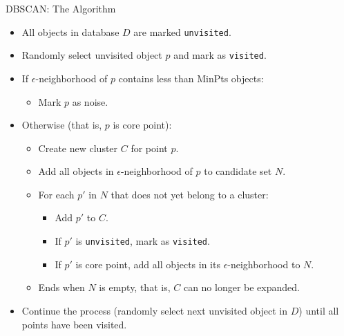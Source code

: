 \begin{frame}{DBSCAN: The Algorithm}
	\begin{itemize}
		\item All objects in database $D$ are marked \texttt{unvisited}.
		\item Randomly select unvisited object $p$ and mark as \texttt{visited}.
		\item If $\epsilon$-neighborhood of $p$ contains less than MinPts
		      objects:
		      \begin{itemize}
			      \item Mark $p$ as noise.
		      \end{itemize}
		\item Otherwise (that is, $p$ is core point):
		      \begin{itemize}
			      \item Create new cluster $C$ for point $p$.
			      \item Add all objects in $\epsilon$-neighborhood of $p$ to
			            candidate set $N$.
			      \item For each $p'$ in $N$ that does not yet belong to a cluster:
			            \begin{itemize}
				            \item Add $p'$ to $C$.
				            \item If $p'$ is \texttt{unvisited}, mark as \texttt{visited}.
				            \item If $p'$ is core point, add all objects in its
				                  $\epsilon$-neighborhood to $N$.
			            \end{itemize}
			      \item Ends when $N$ is empty, that is, $C$ can no longer be
			            expanded.
		      \end{itemize}
		\item Continue the process (randomly select next unvisited object in
		      $D$) until all points have been visited.
	\end{itemize}
\end{frame}

